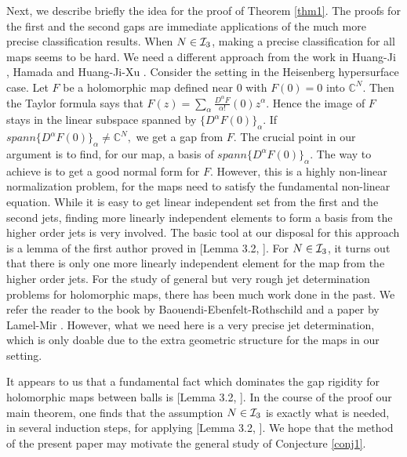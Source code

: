 \documentclass[12pt]{article}
\numberwithin{equation}{section}
\def\a{\alpha}
\def\CC{{\mathbb C}}
\def\a{\alpha}
\def\a{\alpha}
\def\a{\alpha}
\def\a{\alpha}
\begin{document}
Next, we describe briefly the idea for the proof of Theorem
\ref{thm1}. The proofs for the first and the second gaps are
immediate applications of the much more precise classification
results. When $N\in {\cal I}_3$,  making a precise classification
for all maps seems to be hard. We need a different approach from the
work  in Huang-Ji \cite{HJ}, Hamada \cite{Ha1} and Huang-Ji-Xu \cite{HJX1}.
Consider the setting in the Heisenberg hypersurface case.
 Let $F$ be a holomorphic map defined near
$0$ with $F(0)=0$ into ${\CC}^N$. Then the Taylor formula says that
$F(z)=\sum_{\a}\frac{D^\a F}{\a!}(0)z^\a.$ Hence the image of $F$
stays in the linear subspace spanned by $\{D^\a F(0)\}_\a$. If
$spann\{D^\a F(0)\}_\a \not ={\CC}^N,$ we get a gap from  $F$. The
crucial point in our argument is to find, for our map, a basis of
$spann\{D^\a F(0)\}_\a$. The way to achieve is to get a good normal
form for $F$. However, this is a highly non-linear normalization
problem, for the maps need to satisfy the fundamental non-linear
equation. While it is easy to get linear independent set from the
first and the second jets, finding more linearly independent
elements to form a basis from the higher order jets is very
involved. The basic tool at our disposal for this approach  is a
 lemma of the first author proved in [Lemma 3.2, \cite{Hu1}]. For
$N\in {\cal I}_3$, it turns out that there is only one more linearly
independent element for the map from the higher order jets.
For the study of general but very rough jet determination problems
for holomorphic maps, there has been much work done in the past. We
refer the reader to the book by Baouendi-Ebenfelt-Rothschild \cite{BER}
and a  paper by Lamel-Mir \cite{LM}. However, what we need here is a very
precise  jet determination, which is only doable due to the extra
geometric structure for the maps in our setting.

It appears to us that a fundamental fact which dominates the gap
rigidity for holomorphic maps between balls is [Lemma 3.2,
\cite{Hu1}].  In the course of the proof our main theorem, one finds
that the assumption $N\in {\cal I}_3$ is exactly what is needed, in
several induction steps, for applying [Lemma 3.2, \cite{Hu1}]. We
hope that the method of the present paper may motivate the general
study of Conjecture \ref{conj1}.
\end{document}
